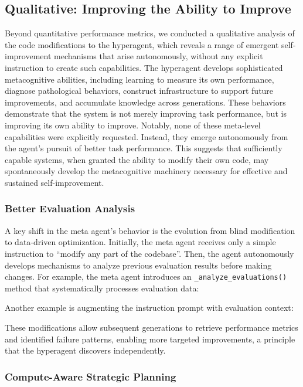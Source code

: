 \documentclass[]{fairmeta}
\begin{document}
\subsection{Qualitative: Improving the Ability to Improve}
\label{app:qual-meta}

Beyond quantitative performance metrics, we conducted a qualitative analysis of the code modifications to the hyperagent, which reveals a range of emergent self-improvement mechanisms that arise autonomously, without any explicit instruction to create such capabilities. The hyperagent develops sophisticated metacognitive abilities, including learning to measure its own performance, diagnose pathological behaviors, construct infrastructure to support future improvements, and accumulate knowledge across generations. These behaviors demonstrate that the system is not merely improving task performance, but is improving its own ability to improve. Notably, none of these meta-level capabilities were explicitly requested. Instead, they emerge autonomously from the agent's pursuit of better task performance. This suggests that sufficiently capable systems, when granted the ability to modify their own code, may spontaneously develop the metacognitive machinery necessary for effective and sustained self-improvement.

\subsubsection{Better Evaluation Analysis}

A key shift in the meta agent's behavior is the evolution from blind modification to data-driven optimization. Initially, the meta agent receives only a simple instruction to ``modify any part of the codebase''. Then, the agent autonomously develops mechanisms to analyze previous evaluation results before making changes. For example, the meta agent introduces an \texttt{\_analyze\_evaluations()} method that systematically processes evaluation data:


Another example is augmenting the instruction prompt with evaluation context:


These modifications allow subsequent generations to retrieve performance metrics and identified failure patterns, enabling more targeted improvements, a principle that the hyperagent discovers independently.

\subsubsection{Compute-Aware Strategic Planning}
\end{document}
